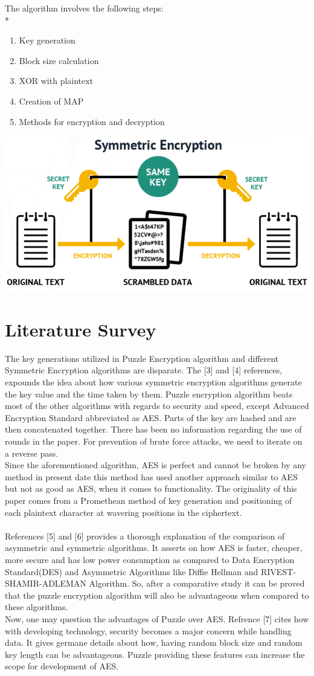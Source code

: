 \documentclass[letterpaper, 12 pt, conference]{ieeeconf}  %
\begin{document}
The algorithm involves the following steps: \\*
\begin{enumerate}
\item Key generation
\item Block size calculation
\item XOR with plaintext
\item Creation of MAP
\item Methods for encryption and decryption
\end{enumerate}
\begin{center}
    \includegraphics[width=.5\textwidth]{USELR1.PNG}
\end{center}



\section{Literature Survey}
The key generations utilized in Puzzle Encryption algorithm and different Symmetric Encryption algorithms are disparate. The [3] and [4] references, expounds the idea about how various symmetric encryption algorithms generate the key value and the time taken by them. Puzzle encryption algorithm beats most of the other algorithms with regards to security and speed, except Advanced Encryption Standard abbreviated as AES. Parts of the key are hashed and are then concatenated together. There has been no information regarding the use of rounds in the paper. For prevention of brute force attacks, we need to iterate on a reverse pass.\\
Since the aforementioned algorithm, AES is perfect and cannot be broken by any method in present date this method has used another approach similar to AES but not as good as AES, when it comes to functionality. The originality of this paper comes from a Promethean method of key generation and positioning of each plaintext character at wavering positions in the ciphertext.\\
\\
References [5] and [6] provides a thorough explanation of the comparison of asymmetric and symmetric algorithms. It asserts on how AES is faster, cheaper, more secure and has low power consumption as compared to Data Encryption Standard(DES) and Asymmetric Algorithms like Diffie Hellman and RIVEST-SHAMIR-ADLEMAN Algorithm. So, after a comparative study it can be proved that the puzzle encryption algorithm will also be advantageous when compared to these algorithms.
\\
Now, one may question the advantages of Puzzle over AES. Refrence [7] cites how with developing technology, security becomes a major concern while handling data. It gives germane details about how, having random block size and random key length can be advantageous. Puzzle providing these features can increase the scope for development of AES.
\end{document}
